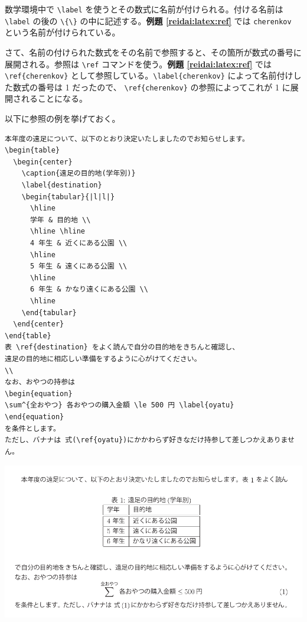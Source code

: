 数学環境中で \verb|\label| を使うとその数式に名前が付けられる。付ける名前は \verb|\label| の後の \verb|\{\}| の中に記述する。\textbf{例題 \ref{reidai:latex:ref}} では \texttt{cherenkov} という名前が付けられている。

さて、名前の付けられた数式をその名前で参照すると、その箇所が数式の番号に展開される。参照は \verb|\ref| コマンドを使う。\textbf{例題 \ref{reidai:latex:ref}} では \verb|\ref{cherenkov}| として参照している。\verb|\label{cherenkov}| によって名前付けした数式の番号は 1 だったので、 \verb|\ref{cherenkov}| の参照によってこれが 1 に展開されることになる。

以下に参照の例を挙げておく。
\begin{reidai}
\begin{verbatim}
本年度の遠足について、以下のとおり決定いたしましたのでお知らせします。
\begin{table}
  \begin{center}
    \caption{遠足の目的地(学年別)}
    \label{destination}
    \begin{tabular}{|l|l|}
      \hline
      学年 & 目的地 \\
      \hline \hline
      4 年生 & 近くにある公園 \\
      \hline
      5 年生 & 遠くにある公園 \\
      \hline
      6 年生 & かなり遠くにある公園 \\
      \hline
    \end{tabular}
  \end{center}
\end{table}
表 \ref{destination} をよく読んで自分の目的地をきちんと確認し、
遠足の目的地に相応しい準備をするように心がけてください。
\\
なお、おやつの持参は
\begin{equation}
\sum^{全おやつ} 各おやつの購入金額 \le 500 円 \label{oyatu}
\end{equation}
を条件とします。
ただし、バナナは 式(\ref{oyatu})にかかわらず好きなだけ持参して差しつかえありません。
\end{verbatim}
\end{reidai}
\vspace*{-1.5em}
\begin{kekka}
  \begin{center}
    \includegraphics[bb=0 0 453 231,width=.9\textwidth]{ref.pdf}
  \end{center}
\end{kekka}


